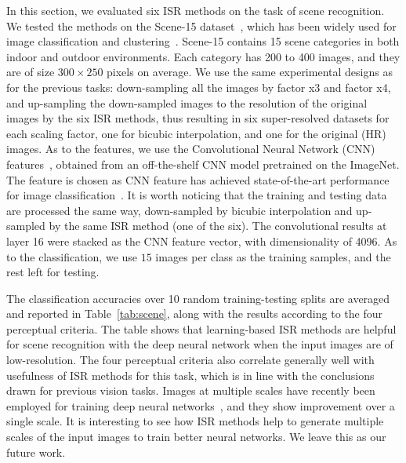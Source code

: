 In this section, we evaluated six ISR methods on the task of scene recognition. 
We tested the methods on the Scene-15 dataset~\cite{lazebnik:cvpr06}, which has been widely 
used for image classification and clustering~\cite{lazebnik:cvpr06, dai:ensemble:eccv12, dai:EnPro:iccv13}. 
Scene-15 contains 15
scene categories in both indoor and outdoor environments. Each category has 200
to 400 images, and they are of size $300 \times 250$ pixels on average.
We use the same experimental designs as for the previous tasks:  down-sampling all the images by 
factor x3 and factor x4, and up-sampling the down-sampled images to the
resolution of the original images by the six ISR methods, thus resulting in six super-resolved datasets 
for each scaling factor, one for bicubic interpolation, and one for the original (HR) images.  
As to the features, we use the  Convolutional Neural Network (CNN) features~\cite{deep:bmvc14}, 
obtained from an off-the-shelf CNN model pretrained on the ImageNet. The feature is  chosen as CNN 
feature has achieved state-of-the-art performance for image
classification~\cite{deep:bmvc14}. It is worth noticing that the training and testing data are processed 
the same way, \ie down-sampled by bicubic interpolation and up-sampled by the same ISR method (one of the six).  
The convolutional results at layer 16 were
stacked as the CNN feature vector, with dimensionality of
4096.  As to the classification, we use $15$ images per class as the training samples, and the rest left for testing. 

The classification accuracies over 10 random training-testing splits are averaged and reported in Table~\ref{tab:scene}, along with the results according to the four perceptual criteria.  
The table shows that learning-based ISR methods are helpful for scene 
recognition with the deep neural network when the input images are of low-resolution. 
The four perceptual criteria also correlate 
generally well with usefulness of ISR methods for this task, 
which is in line with the conclusions drawn for previous vision tasks.   
Images at multiple scales have recently been employed for training deep 
neural networks~\cite{cnn:multi-scale, fully_cnn},  and 
they show improvement over a single scale.  It is interesting to 
see how ISR methods help to generate multiple scales of the input images to train 
better neural networks. We leave this as our future work. 




